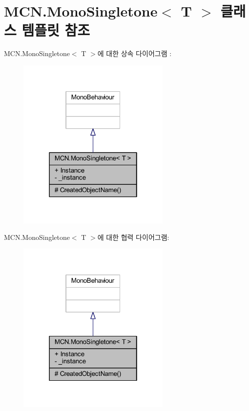 \hypertarget{class_m_c_n_1_1_mono_singletone}{}\section{M\+C\+N.\+Mono\+Singletone$<$ T $>$ 클래스 템플릿 참조}
\label{class_m_c_n_1_1_mono_singletone}


M\+C\+N.\+Mono\+Singletone$<$ T $>$에 대한 상속 다이어그램 \+: \nopagebreak
\begin{figure}[H]
\begin{center}
\leavevmode
\includegraphics[width=214pt]{class_m_c_n_1_1_mono_singletone__inherit__graph}
\end{center}
\end{figure}


M\+C\+N.\+Mono\+Singletone$<$ T $>$에 대한 협력 다이어그램\+:\nopagebreak
\begin{figure}[H]
\begin{center}
\leavevmode
\includegraphics[width=214pt]{class_m_c_n_1_1_mono_singletone__coll__graph}
\end{center}
\end{figure}
